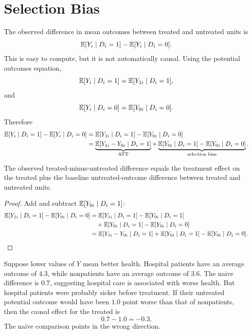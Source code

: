 \section{Selection Bias}

The observed difference in mean outcomes between treated and untreated units is
\[
    \mathbb{E}[Y_i\mid D_i=1]-\mathbb{E}[Y_i\mid D_i=0].
\]
This is easy to compute, but it is not automatically causal. Using the potential
outcomes equation,
\[
    \mathbb{E}[Y_i\mid D_i=1]=\mathbb{E}[Y_{1i}\mid D_i=1],
\]
and
\[
    \mathbb{E}[Y_i\mid D_i=0]=\mathbb{E}[Y_{0i}\mid D_i=0].
\]
Therefore
\[
\begin{aligned}
    \mathbb{E}[Y_i\mid D_i=1]-\mathbb{E}[Y_i\mid D_i=0]
    &=
    \mathbb{E}[Y_{1i}\mid D_i=1]-\mathbb{E}[Y_{0i}\mid D_i=0] \\
    &=
    \underbrace{\mathbb{E}[Y_{1i}-Y_{0i}\mid D_i=1]}_{\mathrm{ATT}}
    +
    \underbrace{\mathbb{E}[Y_{0i}\mid D_i=1]-\mathbb{E}[Y_{0i}\mid D_i=0]}_{\text{selection bias}}.
\end{aligned}
\]

\begin{thmN}
The observed treated-minus-untreated difference equals the treatment effect on
the treated plus the baseline untreated-outcome difference between treated and
untreated units.
\end{thmN}

\begin{proof}
Add and subtract \(\mathbb{E}[Y_{0i}\mid D_i=1]\):
\[
\begin{aligned}
    \mathbb{E}[Y_{1i}\mid D_i=1]-\mathbb{E}[Y_{0i}\mid D_i=0]
    &=
    \mathbb{E}[Y_{1i}\mid D_i=1]-\mathbb{E}[Y_{0i}\mid D_i=1] \\
    &\quad+
    \mathbb{E}[Y_{0i}\mid D_i=1]-\mathbb{E}[Y_{0i}\mid D_i=0] \\
    &=
    \mathbb{E}[Y_{1i}-Y_{0i}\mid D_i=1]
    +
    \mathbb{E}[Y_{0i}\mid D_i=1]-\mathbb{E}[Y_{0i}\mid D_i=0].
\end{aligned}
\]
\end{proof}

\begin{exmp}
Suppose lower values of \(Y\) mean better health. Hospital patients have an
average outcome of \(4.3\), while nonpatients have an average outcome of \(3.6\).
The naive difference is \(0.7\), suggesting hospital care is associated with
worse health. But hospital patients were probably sicker before treatment. If
their untreated potential outcome would have been \(1.0\) point worse than that
of nonpatients, then the causal effect for the treated is
\[
    0.7 - 1.0 = -0.3.
\]
The naive comparison points in the wrong direction.
\end{exmp}

